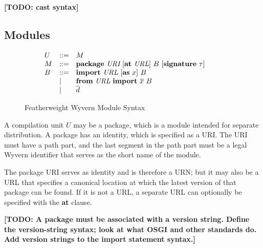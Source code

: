 \documentclass[11pt]{article}
\newcommand{\TODO}[1]{\textbf{[TODO: #1]}}
\newcommand{\keyw}[1]{\textbf{#1}}
\begin{document}
\begin{sloppypar}
\TODO{cast syntax}



\newpage


\subsection{Modules}

\begin{figure}
\centering
\[
\begin{array}{lll}

U    & \bnfdef & M \\

M    & \bnfdef & \keyw{package}~ \textit{URI} ~[\keyw{at}~ \textit{URL}]~
     B ~[\keyw{signature}~ \tau]\\

B    & \bnfdef & \keyw{import}~ \textit{URL} ~[\keyw{as}~ x]~ B\\
     & \bnfalt & \keyw{from}~ \textit{URL} ~\keyw{import}~ \overline{x}~ B \\
     & \bnfalt & \overline{d} \\
	 
\end{array}
\begin{array}{lll}
~~~~
\end{array}
\begin{array}{lll}


\end{array}
\]
\caption{Featherweight Wyvern Module Syntax}
\label{fig:module-syntax}
\end{figure}

A compilation unit $U$ may be a package, which is a module intended for separate distribution.  A package has an identity, which is specified as a URI.  The URI must have a path part, and the last segment in the path part must be a legal Wyvern identifier that serves as the short name of the module.

The package URI serves as identity and is therefore a URN; but it may also be a URL that specifies a canonical location at which the latest version of that package can be found.  If it is not a URL, a separate URL can optionally be specified with the \keyw{at} clause.

\TODO{A package must be associated with a version string.  Define the version-string syntax; look at what OSGI and other standards do.  Add version strings to the import statement syntax.}


\end{sloppypar}
\end{document}
